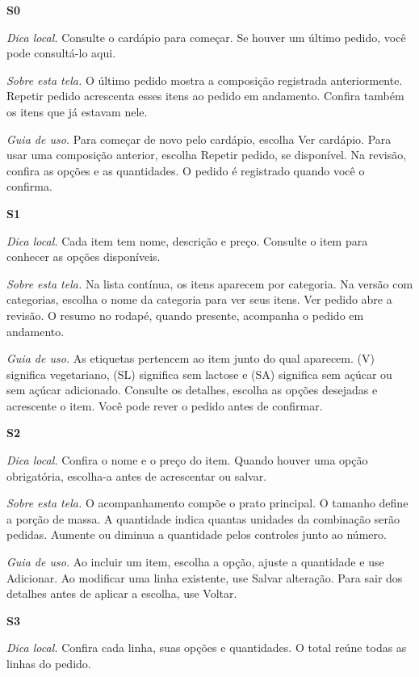 \par\smallskip\noindent\textbf{S0}
\par\noindent\emph{Dica local.} Consulte o cardápio para começar. Se houver um último pedido, você pode consultá-lo aqui.
\par\noindent\emph{Sobre esta tela.} O último pedido mostra a composição registrada anteriormente. Repetir pedido acrescenta esses itens ao pedido em andamento. Confira também os itens que já estavam nele.
\par\noindent\emph{Guia de uso.} Para começar de novo pelo cardápio, escolha Ver cardápio. Para usar uma composição anterior, escolha Repetir pedido, se disponível. Na revisão, confira as opções e as quantidades. O pedido é registrado quando você o confirma.
\par\smallskip\noindent\textbf{S1}
\par\noindent\emph{Dica local.} Cada item tem nome, descrição e preço. Consulte o item para conhecer as opções disponíveis.
\par\noindent\emph{Sobre esta tela.} Na lista contínua, os itens aparecem por categoria. Na versão com categorias, escolha o nome da categoria para ver seus itens. Ver pedido abre a revisão. O resumo no rodapé, quando presente, acompanha o pedido em andamento.
\par\noindent\emph{Guia de uso.} As etiquetas pertencem ao item junto do qual aparecem. (V) significa vegetariano, (SL) significa sem lactose e (SA) significa sem açúcar ou sem açúcar adicionado. Consulte os detalhes, escolha as opções desejadas e acrescente o item. Você pode rever o pedido antes de confirmar.
\par\smallskip\noindent\textbf{S2}
\par\noindent\emph{Dica local.} Confira o nome e o preço do item. Quando houver uma opção obrigatória, escolha-a antes de acrescentar ou salvar.
\par\noindent\emph{Sobre esta tela.} O acompanhamento compõe o prato principal. O tamanho define a porção de massa. A quantidade indica quantas unidades da combinação serão pedidas. Aumente ou diminua a quantidade pelos controles junto ao número.
\par\noindent\emph{Guia de uso.} Ao incluir um item, escolha a opção, ajuste a quantidade e use Adicionar. Ao modificar uma linha existente, use Salvar alteração. Para sair dos detalhes antes de aplicar a escolha, use Voltar.
\par\smallskip\noindent\textbf{S3}
\par\noindent\emph{Dica local.} Confira cada linha, suas opções e quantidades. O total reúne todas as linhas do pedido.
